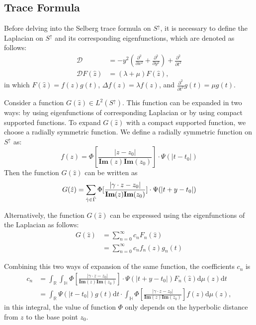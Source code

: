 \documentclass[12pt,a4paper,english]{article}
\theoremstyle{plain}
\theoremstyle{definition}
\theoremstyle{remark}
\newcommand{\dd}{\text{d}}
\newcommand{\RR}{\mathbb{R}}
\newcommand{\HH}{\mathbb{H}}
\begin{document}
\subsection{Trace Formula}
Before delving into the Selberg trace formula on $S^{\uparrow}$, it is necessary to define the Laplacian on $S^{\uparrow}$ and its corresponding eigenfunctions, which are denoted as follows:
\begin{align*}
     \mathcal{D}&=-y^{2}(\frac{\partial^{2}}{\partial x^{2}}+\frac{\partial^{2}}{\partial y^{2}}) + \frac{\partial^{2}}{\partial t^{2}}\\
             \mathcal{D} F(\hat{z})&= (\lambda+\mu)F(\hat{z}),
\end{align*}
 in which $F(\hat{z})=f(z)g(t)$, $\Delta f(z)=\lambda f(z)$, and $\frac{\partial^{2}}{\partial t^{2}} g(t) = \mu g(t)$.

Consider a function $G(\hat{z})\in L^{2}(S^{\uparrow})$. This function can be expanded in two ways: by using eigenfunctions of corresponding Laplacian or by using compact supported functions.  To expand $G(\hat{z})$ with a compact supported function, we choose a radially symmetric function. We define a radially symmetric function on $S^{\uparrow}$ as:
\begin{equation*}
    f(z)=\Phi[\frac{|z-z_{0}|}{\textbf{Im}(z)\textbf{Im}(z_{0})}]\cdot\Psi(|t-t_{0}|)
\end{equation*}
Then the function $G(\hat{z})$ can be written as 
\begin{equation*}
    G(\hat{z})=\sum_{\hat{\gamma}\in\Tilde{\Gamma}}\Phi[\frac{|\gamma\cdot z-z_{0}|}{\textbf{Im}(z)\textbf{Im}(z_{0})}]\cdot\Psi(|t+y -t_{0}|)
\end{equation*}

Alternatively, the function $G(\hat{z})$ can be expressed using the eigenfunctions of the Laplacian as follows: 
\begin{align*}
    G(\hat{z})&=\sum_{n=0}^{\infty} c_{n}F_{n}(\hat{z})\\
                &= \sum_{n=0}^{\infty} c_{n}f_{n}(z)g_{n}(t)
\end{align*}

Combining this two ways of expansion of the same function, the coefficients $c_{n}$ is 
\begin{align*}
    c_{n}&=\int_{\RR}\int_{\HH}\Phi[\frac{|\gamma\cdot z-z_{0}|}{\textbf{Im}(z)\textbf{Im}(z_{0})}]\cdot\Psi(|t+y -t_{0}|)F_{n}(\hat{z})\dd \mu(z)\dd t\\
    &=\int_{\RR}\Psi(|t-t_{0}|)g(t)\dd t\cdot \int_{\HH} \Phi[\frac{|\gamma\cdot z-z_{0}|}{\textbf{Im}(z)\textbf{Im}(z_{0})}] f(z)\dd \mu(z),
\end{align*}
in this integral, the value of function $\Phi$ only depends on the hyperbolic distance from $z$ to the base point $z_{0}$. 
\end{document}
